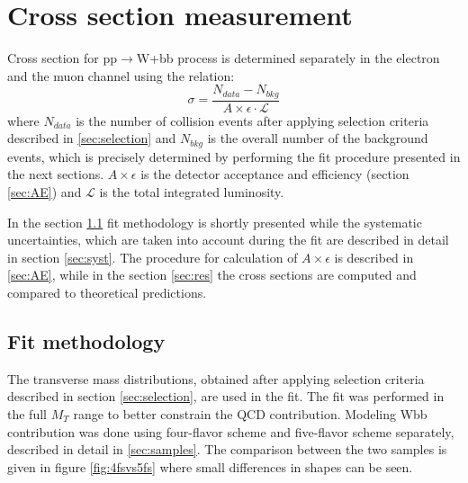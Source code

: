\chapter{Cross section measurement} %

\label{Chapter7} %



Cross section for pp$\rightarrow$W+bb process is determined separately in the electron and the muon channel using the relation:
\begin{equation}
\sigma = \frac{N_{data}-N_{bkg}}{A\times \epsilon \cdot \mathcal{L}}
\label{equ:xsec}
\end{equation}
where $N_{data}$ is the number of collision events after applying selection criteria described in \ref{sec:selection} and $N_{bkg}$ is the overall number of the background events, which is precisely determined by performing the fit procedure presented in the next sections. $A\times \epsilon$ is the detector acceptance and efficiency (section \ref{sec:AE}) and $\mathcal{L}$ is the total integrated luminosity. 
\par In the section \ref{sec:fit} fit methodology is shortly presented while the systematic uncertainties, which are taken into account during the fit are described in detail in section \ref{sec:syst}. The procedure for calculation of $A\times \epsilon$ is described in \ref{sec:AE}, while in the section \ref{sec:res} the cross sections are computed and compared to theoretical predictions. 


\section{Fit methodology}
\label{sec:fit}

The transverse mass distributions, obtained after applying selection criteria described in section \ref{sec:selection}, are used in the fit. The fit was performed in the full $M_T$ range to better constrain the QCD contribution.  
Modeling Wbb contribution was done using four-flavor scheme and five-flavor scheme separately, described in detail in \ref{sec:samples}. The comparison between the two samples is given in figure \ref{fig:4fsvs5fs} where small differences in shapes can be seen.

